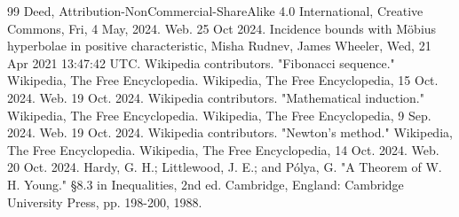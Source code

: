 \documentclass{book}
\begin{document}
\begin{thebibliography}{99}
    Deed, Attribution-NonCommercial-ShareAlike 4.0 International, Creative Commons, Fri, 4 May, 2024. Web. 25 Oct 2024.
    Incidence bounds with Möbius hyperbolae in positive characteristic, Misha Rudnev, James Wheeler, Wed, 21 Apr 2021 13:47:42 UTC.
    Wikipedia contributors. "Fibonacci sequence." Wikipedia, The Free Encyclopedia. Wikipedia, The Free Encyclopedia, 15 Oct. 2024. Web. 19 Oct. 2024.
    Wikipedia contributors. "Mathematical induction." Wikipedia, The Free Encyclopedia. Wikipedia, The Free Encyclopedia, 9 Sep. 2024. Web. 19 Oct. 2024.
    Wikipedia contributors. "Newton's method." Wikipedia, The Free Encyclopedia. Wikipedia, The Free Encyclopedia, 14 Oct. 2024. Web. 20 Oct. 2024.
    Hardy, G. H.; Littlewood, J. E.; and Pólya, G. "A Theorem of W. H. Young." §8.3 in Inequalities, 2nd ed. Cambridge, England: Cambridge University Press, pp. 198-200, 1988.
\end{thebibliography}
\end{document}
